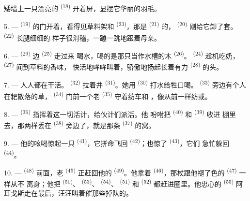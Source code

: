 矮墙上一只漂亮的 \textsuperscript{(18)} 开着屏，显摆它华丽的羽毛。

\VUsaut{3.0mm}

5. ---  \textsuperscript{(19)} 的门开着，看得见草料架和
 \textsuperscript{(23)}，那是 \textsuperscript{(21)} 的，
 \textsuperscript{(20)} 刚给它卸了套。 \textsuperscript{(22)} 长腿细细的
样子很滑稽，一蹦一跳地跟着母亲。

6. ---  \textsuperscript{(29)} 边 \textsuperscript{(25)} 走过来
喝水，喝的是那只当作水槽的木 \textsuperscript{(26)}。
\textsuperscript{(24)} 趁机吃奶， \textsuperscript{(27)} 闻到草料的香味，
快活地哞哞叫着，骄傲地扬起长着有力 \textsuperscript{(28)} 的头。

7. --- 人人都在干活。 \textsuperscript{(32)} 拉着井
\textsuperscript{(31)}。她用 \textsuperscript{(30)} 打水给牲口喝。
 \textsuperscript{(33)} 旁边有个人在耙散落的草，
\textsuperscript{(34)} 门前一个老 \textsuperscript{(35)} 守着纺车和
，像从前一样纺或。

\VUsaut{3.0mm}
\VUsaut{3.0mm}

8. ---  \textsuperscript{(36)} 指挥着这一切活计，给伙计们派活。他
吩咐把 \textsuperscript{(40)} 和 \textsuperscript{(39)} 收进
棚里去，那两样丢在 \textsuperscript{(38)} 旁边了，就是那条
\textsuperscript{(37)} 的窝。

9. --- 他的吆喝惊起一只 \textsuperscript{(41)}，它拼命飞回
 \textsuperscript{(42)}；也惊了 \textsuperscript{(43)}，它们
急忙躲回 \textsuperscript{(44)}。

10. ---  \textsuperscript{(48)} 前面，老 \textsuperscript{(45)}
正赶回他的 \textsuperscript{(49)}。他拿着
\textsuperscript{(46)}，那杖跟他褪了色的 \textsuperscript{(47)} 一样从不
离身；他把 \textsuperscript{(50)}、 \textsuperscript{(53)}、
 \textsuperscript{(54)}、 \textsuperscript{(51)} 和
 \textsuperscript{(52)} 都赶进圈里。他忠心的
\textsuperscript{(55)} 阿耳戈斯走在最后，汪汪叫着催那些掉队的。

